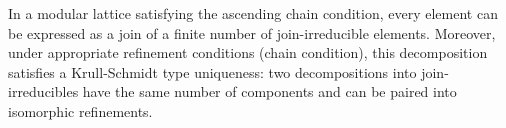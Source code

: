 In a modular lattice satisfying the ascending chain condition, every element can be expressed as a join of a finite number of join-irreducible elements. Moreover, under appropriate refinement conditions (chain condition), this decomposition satisfies a Krull-Schmidt type uniqueness: two decompositions into join-irreducibles have the same number of components and can be paired into isomorphic refinements.
